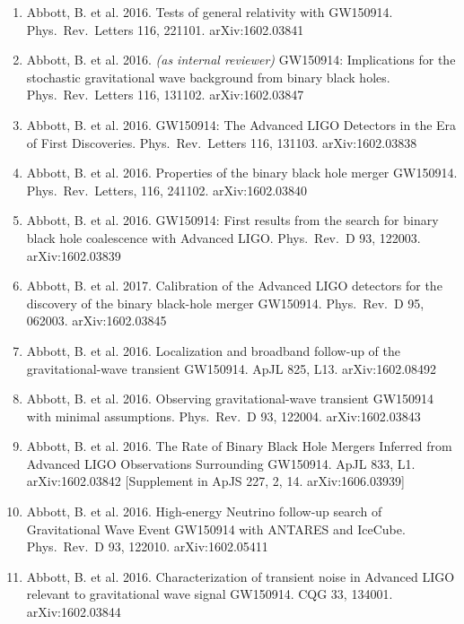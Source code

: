 \documentclass[margin,line]{res}
\begin{document}
\begin{resume}
\begin{enumerate}
\item Abbott, B. et al. 2016. Tests of general relativity with GW150914. Phys.~Rev.~Letters 116, 221101. arXiv:1602.03841

\item Abbott, B. et al. 2016.  {\it (as internal reviewer)}   GW150914: Implications for the stochastic gravitational wave background from binary black holes.  Phys.~Rev.~Letters 116, 131102.  arXiv:1602.03847

\item Abbott, B. et al. 2016. GW150914: The Advanced LIGO Detectors in the Era of First Discoveries.   Phys.~Rev.~Letters 116, 131103.  arXiv:1602.03838

\item Abbott, B. et al. 2016. Properties of the binary black hole merger GW150914.   Phys.~Rev.~Letters, 116, 241102.  arXiv:1602.03840

\item Abbott, B. et al. 2016. GW150914: First results from the search for binary black hole coalescence with Advanced LIGO.  Phys.~Rev.~D 93, 122003.  arXiv:1602.03839

\item Abbott, B. et al. 2017. Calibration of the Advanced LIGO detectors for the discovery of the binary black-hole merger GW150914.   Phys.~Rev.~D 95, 062003.  arXiv:1602.03845

\item Abbott, B. et al. 2016. Localization and broadband follow-up of the gravitational-wave transient GW150914.   ApJL 825, L13. arXiv:1602.08492

\item Abbott, B. et al. 2016. Observing gravitational-wave transient GW150914 with minimal assumptions.  Phys.~Rev.~D 93, 122004. arXiv:1602.03843

\item Abbott, B. et al. 2016. The Rate of Binary Black Hole Mergers Inferred from Advanced LIGO Observations Surrounding GW150914. ApJL 833, L1.  arXiv:1602.03842  [Supplement in ApJS 227, 2, 14. arXiv:1606.03939]

\item Abbott, B. et al. 2016.  High-energy Neutrino follow-up search of Gravitational Wave Event GW150914 with ANTARES and IceCube.   Phys.~Rev.~D 93, 122010. arXiv:1602.05411

\item Abbott, B. et al. 2016. Characterization of transient noise in Advanced LIGO relevant to gravitational wave signal GW150914.   CQG 33, 134001. arXiv:1602.03844


\end{enumerate}
\end{resume}
\end{document}
